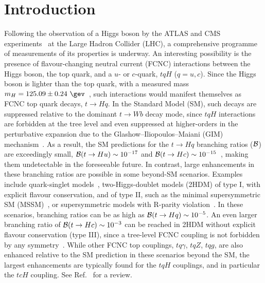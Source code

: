 
\section{Introduction}
\label{sec:intro}

Following the observation of a Higgs boson by the ATLAS and CMS experiments~\cite{Aad:2012tfa,Chatrchyan:2012ufa} at
the Large Hadron Collider (LHC), a comprehensive programme of measurements of its properties is underway.
An interesting possibility is the presence of flavour-changing neutral current (FCNC) interactions 
between the Higgs boson, the top quark, and a $u$- or $c$-quark, $tqH$ ($q=u,c$). Since the Higgs boson is lighter than the top quark, with a 
measured mass $m_H=125.09 \pm 0.24~\gev$~\cite{Aad:2015zhl}, such interactions would manifest themselves as FCNC top quark decays, $t\to H q$.  
In the Standard Model (SM), such decays are suppressed relative to the dominant $t\to Wb$ decay mode, since $tqH$ 
interactions are forbidden at the tree level and even suppressed at higher-orders in the perturbative expansion due to the 
Glashow--Iliopoulos--Maiani (GIM) mechanism~\cite{Glashow:1970gm}.  As a result, the SM predictions for the $t \to Hq$ branching 
ratios ($\mathcal{B}$) are exceedingly small, $\mathcal{B}(t\to Hu) \sim 10^{-17} $ and $\mathcal{B}(t\to Hc) \sim 10^{-15}$~\cite{Eilam:1990zc,Mele:1998ag,AguilarSaavedra:2004wm,Zhang:2013xya}, making them undetectable in the foreseeable future.
In contrast, large enhancements in these branching ratios are possible in some beyond-SM scenarios.
Examples include quark-singlet models~\cite{AguilarSaavedra:2002kr}, two-Higgs-doublet models (2HDM) of type I, with explicit flavour conservation,
and of type II, such as the minimal supersymmetric SM (MSSM)~\cite{Bejar:2000ub, Guasch:1999jp,Cao:2007dk}, or supersymmetric models
with R-parity violation~\cite{Eilam:2001dh}. In these scenarios, branching ratios can be as high as $\mathcal{B}(t\to Hq) \sim 10^{-5}$. 
An even larger branching ratio of  $\mathcal{B}(t\to Hc) \sim 10^{-3}$ can be reached in 2HDM without explicit flavour conservation (type III),
since a tree-level FCNC coupling is not forbidden by any symmetry~\cite{Cheng:1987rs,Baum:2008qm,Chen:2013qta}. 
While other FCNC top couplings, $tq\gamma$, $tqZ$, $tqg$, are also enhanced relative to the SM prediction in these scenarios beyond the SM, 
the largest enhancements are typically found for the $tqH$ couplings, and in particular the $tcH$ coupling. 
See Ref.~\cite{Agashe:2013hma} for a review.

